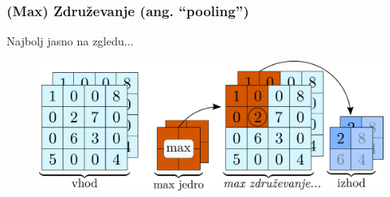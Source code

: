 \documentclass[14pt, t]{beamer}
\begin{document}
\begin{frame}
    \frametitle{(Max) Združevanje (ang. ``pooling'')}

    \vspace{3mm}
    Najbolj jasno na zgledu...

    
    

    \vspace{-1mm}
    \begin{figure}[htb!]
        \centering
        \includegraphics[width=\linewidth]{vector/figures-slo/pooling.pdf}
    \end{figure}   

\end{frame}
\end{document}
